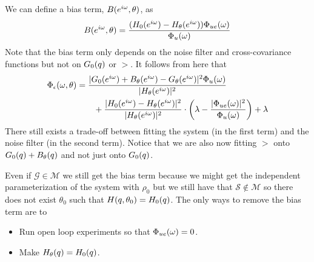 We can define a bias term, $B(e^{i\omega},\theta)$, as
$$B(e^{i\omega},\theta) = \frac{(H_0(e^{i\omega})-H_\theta(e^{i\omega}))\Phi_{ue}(\omega)}{\Phi_u(\omega)}$$
Note that the bias term only depends on the noise filter and cross-covariance functions but not on $G_0(q)$ or $\gt$. It follows from here that
\begin{align*}
\Phi_\epsilon(\omega,\theta) &= \frac{|G_0(e^{i\omega})+B_\theta(e^{i\omega})-G_\theta(e^{i\omega})|^2\Phi_u(\omega)}{|H_\theta(e^{i\omega})|^2} \\
&\qquad + \frac{|H_0(e^{i\omega})-H_\theta(e^{i\omega})|^2}{|H_\theta(e^{i\omega})|^2}\cdot \left(\lambda-\frac{|\Phi_{ue}(\omega)|^2}{\Phi_u(\omega)}\right) + \lambda
\end{align*}
There still exists a trade-off between fitting the system (in the first term) and the noise filter (in the second term). Notice that we are also now fitting $\gt$ onto $G_0(q)+B_\theta(q)$ and not just onto $G_0(q)$.

Even if $\mathcal{G}\in\mathcal{M}$ we still get the bias term because we might get the independent parameterization of the system with $\rho_0$ but we still have that $\mathcal{S}\notin\mathcal{M}$ so there does not exist $\theta_0$ such that $H(q,\theta_0)=H_0(q)$. The only ways to remove the bias term are to
\begin{itemize}
\item Run open loop experiments so that $\Phi_{ue}(\omega)=0$.
\item Make $H_\theta(q)=H_0(q)$.
\end{itemize}

